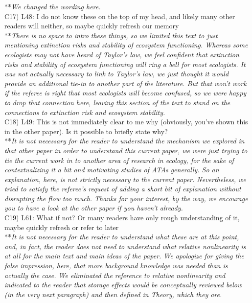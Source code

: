 \documentclass[letterpaper,11pt]{article}
\begin{document}
\noindent ***\emph{We changed the wording here.} \\

\noindent C17) L48: I do not know these on the top of my head, and likely many other readers will neither, so maybe quickly refresh our memory \\

\noindent ***\emph{There is no space to intro these things, so we limited this text to just mentioning 
extinction risks and stability of ecosystem functioning. Whereas some ecologists may not have heard of 
Taylor's law, we feel confident that extinction risks and stability of ecosystem functioning will ring
a bell for most ecologists. It was not actually necessary to link to Taylor's law, we just thought it 
would provide an additional tie-in to another part of the literature. But that won't work if the referee is right 
that most ecologists will become confused, so we were happy to drop that connection here, leaving this
section of the text to stand on the connections to extinction risk and ecosystem stability.} \\

\noindent C18) L49: This is not immediately clear to me why (obviously, you’ve shown this in the other paper). Is it possible to briefly state why? \\

\noindent ***\emph{It is not necessary for the reader to understand the mechanism we explored in that other
paper in order to understand this current paper, we were just trying to tie the current work in to 
another area of research in ecology, for the sake of contextualizing it a bit and motivating studies of ATAs generally. 
So an explanation, here, is not 
strictly necessary to the current paper. Nevertheless, we tried to satisfy the referee's request of adding a short bit of explanation
without disrupting the flow too much. Thanks for your interest, by the way, we encourage you to have a look at the
other paper if you haven't already.} \\

\noindent C19) L61: What if not? Or many readers have only rough understanding of it, maybe quickly refresh or refer to later \\

\noindent ***\emph{It is not necessary for the reader to understand what these are at this point, and,
in fact, the reader does not need to understand what relative nonlinearity is at all for the main text
and main ideas of the paper. We apologize for giving the false impression, here, that more background knowledge was needed
than is actually the case. We eliminated the reference to relative nonlinearity and indicated to the 
reader that storage effects would be conceptually reviewed below (in the very next paragraph) and then 
defined in Theory, which they are.} \\
\end{document}
